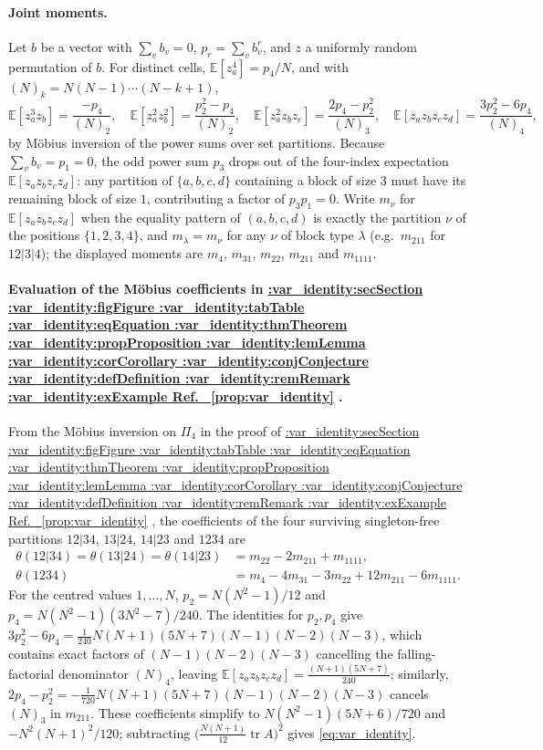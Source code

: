 \documentclass[11pt,a4paper]{article}
\makeatletter
\def\Cref@getprefix#1:#2\relax{#1}
\def\Cref@prefix@sec{sec}
\def\Cref@prefix@fig{fig}
\def\Cref@prefix@tab{tab}
\def\Cref@prefix@eq{eq}
\def\Cref@prefix@thm{thm}
\def\Cref@prefix@prop{prop}
\def\Cref@prefix@lem{lem}
\def\Cref@prefix@cor{cor}
\def\Cref@prefix@conj{conj}
\def\Cref@prefix@def{def}
\def\Cref@prefix@rem{rem}
\def\Cref@prefix@ex{ex}
\def\Cref@type@cap#1{%
  \edef\Cref@tmp{#1}%
  \ifx\Cref@tmp\Cref@prefix@sec Section%
  \else\ifx\Cref@tmp\Cref@prefix@fig Figure%
  \else\ifx\Cref@tmp\Cref@prefix@tab Table%
  \else\ifx\Cref@tmp\Cref@prefix@eq Equation%
  \else\ifx\Cref@tmp\Cref@prefix@thm Theorem%
  \else\ifx\Cref@tmp\Cref@prefix@prop Proposition%
  \else\ifx\Cref@tmp\Cref@prefix@lem Lemma%
  \else\ifx\Cref@tmp\Cref@prefix@cor Corollary%
  \else\ifx\Cref@tmp\Cref@prefix@conj Conjecture%
  \else\ifx\Cref@tmp\Cref@prefix@def Definition%
  \else\ifx\Cref@tmp\Cref@prefix@rem Remark%
  \else\ifx\Cref@tmp\Cref@prefix@ex Example%
  \else Ref.%
  \fi\fi\fi\fi\fi\fi\fi\fi\fi\fi\fi\fi
}
\DeclareRobustCommand{\Cref}[1]{%
  \begingroup
  \edef\Cref@label{#1}%
  \edef\Cref@prefix{\expandafter\Cref@getprefix\Cref@label:\relax}%
  \hyperref[#1]{\Cref@type@cap{\Cref@prefix}~\ref*{#1}}%
  \endgroup
}
\theoremstyle{plain}
\theoremstyle{definition}
\theoremstyle{remark}
\newcommand{\E}{\mathbb{E}}
\newcommand{\tr}{\operatorname{tr}}
\makeatother
\begin{document}
\paragraph{Joint moments.}
Let $b$ be a vector with $\sum_vb_v=0$, $p_r=\sum_vb_v^r$, and $z$ a uniformly random permutation of $b$.
For distinct cells, $\E[z_a^4]=p_4/N$, and with $(N)_k=N(N-1)\cdots(N-k+1)$,
\[
\E[z_a^3z_b]=\frac{-p_4}{(N)_2},\quad \E[z_a^2z_b^2]=\frac{p_2^2-p_4}{(N)_2},\quad \E[z_a^2z_bz_c]=\frac{2p_4-p_2^2}{(N)_3},\quad \E[z_az_bz_cz_d]=\frac{3p_2^2-6p_4}{(N)_4},
\]
by M\"obius inversion of the power sums over set partitions.
Because $\sum_v b_v = p_1 = 0$, the odd power sum $p_3$ drops out of the four-index expectation $\E[z_a z_b z_c z_d]$: any partition of $\{a,b,c,d\}$ containing a block of size $3$ must have its remaining block of size $1$, contributing a factor of $p_3 p_1 = 0$.
Write $m_\nu$ for $\E[z_az_bz_cz_d]$ when the equality pattern of $(a,b,c,d)$ is exactly the partition $\nu$ of the positions $\{1,2,3,4\}$, and $m_\lambda=m_\nu$ for any $\nu$ of block type $\lambda$ (e.g.\ $m_{211}$ for $12|3|4$); the displayed moments are $m_4$, $m_{31}$, $m_{22}$, $m_{211}$ and $m_{1111}$.

\paragraph{Evaluation of the M\"obius coefficients in \Cref{prop:var_identity}.}
From the M\"obius inversion on $\Pi_4$ in the proof of \Cref{prop:var_identity}, the coefficients of the four surviving singleton-free partitions $12|34$, $13|24$, $14|23$ and $1234$ are
\[
\begin{aligned}\theta(12|34)=\theta(13|24)=\theta(14|23)&=m_{22}-2m_{211}+m_{1111},\\ \theta(1234)&=m_4-4m_{31}-3m_{22}+12m_{211}-6m_{1111}.\end{aligned}
\]
For the centred values $1,\dots,N$, $p_2=N(N^2-1)/12$ and $p_4=N(N^2-1)(3N^2-7)/240$.
The identities for $p_2, p_4$ give $3p_2^2 - 6p_4 = \frac{1}{240}N(N+1)(5N+7)(N-1)(N-2)(N-3)$, which contains exact factors of $(N-1)(N-2)(N-3)$ cancelling the falling-factorial denominator $(N)_4$, leaving $\E[z_a z_b z_c z_d] = \frac{(N+1)(5N+7)}{240}$; similarly, $2p_4 - p_2^2 = -\frac{1}{720}N(N+1)(5N+7)(N-1)(N-2)(N-3)$ cancels $(N)_3$ in $m_{211}$.
These coefficients simplify to $N(N^2-1)(5N+6)/720$ and $-N^2(N+1)^2/120$; subtracting $\bigl(\frac{N(N+1)}{12}\tr A\bigr)^2$ gives \eqref{eq:var_identity}.
\end{document}
